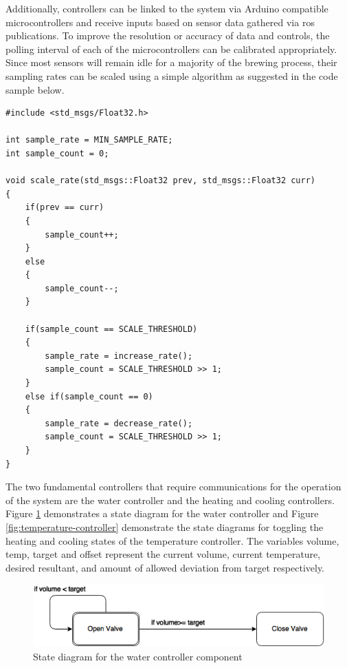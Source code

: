 \documentclass{article}
\begin{document}
Additionally, controllers can be linked to the system via Arduino compatible microcontrollers and receive inputs based on sensor data gathered via \gls{ros} publications.  To improve the resolution or accuracy of data and controls, the polling interval of each of the microcontrollers can be calibrated appropriately.  Since most sensors will remain idle for a majority of the brewing process, their sampling rates can be scaled using a simple algorithm as suggested in the code sample below.

\begin{lstlisting}
#include <std_msgs/Float32.h>

int sample_rate = MIN_SAMPLE_RATE;
int sample_count = 0;

void scale_rate(std_msgs::Float32 prev, std_msgs::Float32 curr)
{
    if(prev == curr)
    {
        sample_count++;
    }
    else
	{
        sample_count--;
	}

	if(sample_count == SCALE_THRESHOLD)
	{
   		sample_rate = increase_rate();
    	sample_count = SCALE_THRESHOLD >> 1;
	}
	else if(sample_count == 0)
	{
    	sample_rate = decrease_rate();
    	sample_count = SCALE_THRESHOLD >> 1;
	}
}
\end{lstlisting}

The two fundamental controllers that require communications for the operation of the system are the water controller and the heating and cooling controllers.  Figure \ref{fig:water-controller} demonstrates a state diagram for the water controller and Figure \ref{fig:temperature-controller} demonstrate the state diagrams for toggling the heating and cooling states of the temperature controller.  The variables volume, temp, target and offset represent the current volume, current temperature, desired resultant, and amount of allowed deviation from target respectively.

\begin{figure}[H]
\begin{center}
\includegraphics[scale=0.70]{water-controller-state-diagram.png}
\caption{State diagram for the water controller component}
\label{fig:water-controller}
\end{center}
\end{figure}
\end{document}
